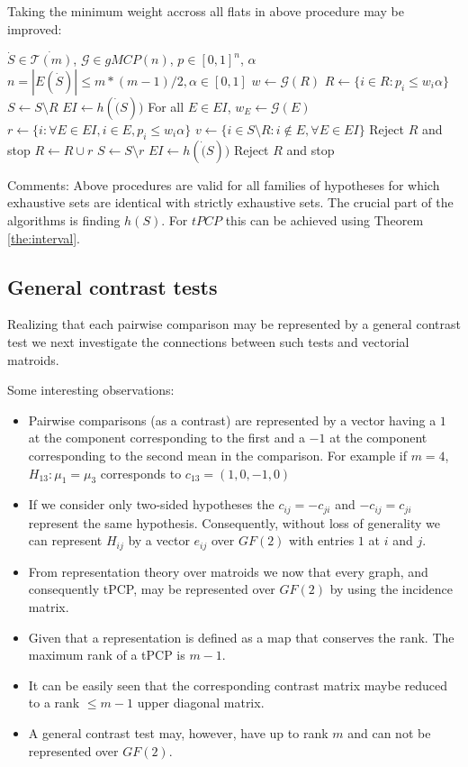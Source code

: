 \documentclass[a4paper,12pt]{article}
\newcommand{\gmcp}{\mathcal{G}}
\begin{document}
Taking the minimum weight accross all flats in above procedure may be
improved:

\begin{algorithmic}
  \REQUIRE $\dot{S} \in \dot{\mathcal{T}(m)}$, $\gmcp \in gMCP(n)$, 
  $p \in [0,1]^n$, $\alpha$
  \ENSURE $n = |E(\dot{S})| \leq m*(m-1)/2, \alpha \in [0,1]$
  \STATE $w \gets \gmcp(R)$
  \STATE $R \gets \{i \in R: p_i \leq w_i \alpha\}$
  \STATE $S \gets S \setminus R$
  \STATE $EI \gets h(\dot(S))$
  \STATE For all $E \in EI$, $w_E \gets \gmcp(E)$
  \STATE $r \gets \{i:\forall E \in EI, i \in E,p_i \leq w_i \alpha\}$
  \STATE $v \gets \{i \in S\setminus R:i \notin E, \forall E \in EI\}$
  \STATE Reject $R$ and stop
  \ENDIF
  \STATE $R \gets R \cup r$
  \STATE $S \gets S\setminus r$
  \STATE $EI \gets h(\dot(S))$
  \ENDWHILE
  \STATE Reject $R$ and stop
\end{algorithmic}

Comments: Above procedures are valid for all families of hypotheses
for which exhaustive sets are identical with strictly exhaustive
sets. The crucial part of the algorithms is finding $h(S)$. For $tPCP$
this can be achieved using Theorem \ref{the:interval}.





\subsection{General contrast tests}

Realizing that each pairwise comparison may be represented by a
general contrast test we next investigate the connections between such
tests and vectorial matroids. 

Some interesting observations:
\begin{itemize}
\item Pairwise comparisons (as a contrast) are represented by a vector
  having a $1$ at the component corresponding to the first and a $-1$
  at the component corresponding to the second mean in the
  comparison. For example if $m = 4$, $H_{13}: \mu_1 = \mu_3$
  corresponds to  $c_{13} = (1,0,-1,0)$ 
\item If we consider only two-sided hypotheses the $c_{ij} = -c_{ji}$ and
  $-c_{ij} = c_{ji}$  represent the same hypothesis. Consequently,
  without loss of generality we can represent $H_{ij}$ by a vector
  $e_{ij}$ over $GF(2)$ with entries $1$ at $i$ and $j$.
\item From representation theory over matroids we now that every graph,
  and consequently tPCP, may be represented over $GF(2)$ by using the
  incidence matrix.
\item Given that a representation is defined as a map that conserves
  the rank. The maximum rank of a tPCP is $m-1$.
\item It can be easily seen that the corresponding contrast matrix
  maybe reduced to a rank $\leq m-1$ upper diagonal matrix.
\item A general contrast test may, however, have up to rank $m$ and
  can not be represented over $GF(2)$.
\end{itemize}
\end{document}
